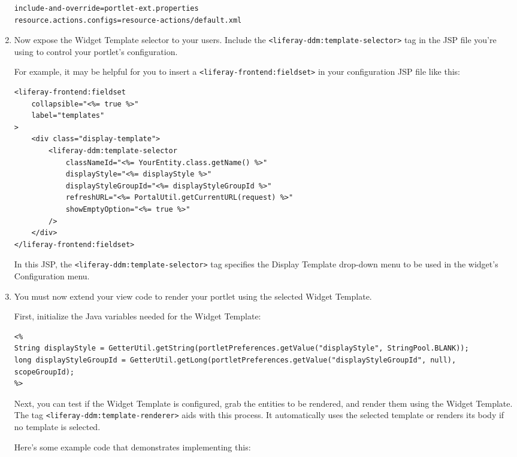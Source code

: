 \begin{enumerate}
\begin{verbatim}
include-and-override=portlet-ext.properties
resource.actions.configs=resource-actions/default.xml
\end{verbatim}
\item
  Now expose the Widget Template selector to your users. Include the
  \texttt{\textless{}liferay-ddm:template-selector\textgreater{}} tag in
  the JSP file you're using to control your portlet's configuration.

  For example, it may be helpful for you to insert a
  \texttt{\textless{}liferay-frontend:fieldset\textgreater{}} in your
  configuration JSP file like this:

\begin{verbatim}
<liferay-frontend:fieldset
    collapsible="<%= true %>"
    label="templates"
>
    <div class="display-template">
        <liferay-ddm:template-selector
            classNameId="<%= YourEntity.class.getName() %>"
            displayStyle="<%= displayStyle %>"
            displayStyleGroupId="<%= displayStyleGroupId %>"
            refreshURL="<%= PortalUtil.getCurrentURL(request) %>"
            showEmptyOption="<%= true %>"
        />
    </div>
</liferay-frontend:fieldset>
\end{verbatim}

  In this JSP, the
  \texttt{\textless{}liferay-ddm:template-selector\textgreater{}} tag
  specifies the Display Template drop-down menu to be used in the
  widget's Configuration menu.
\item
  You must now extend your view code to render your portlet using the
  selected Widget Template.

  First, initialize the Java variables needed for the Widget Template:

\begin{verbatim}
<%
String displayStyle = GetterUtil.getString(portletPreferences.getValue("displayStyle", StringPool.BLANK));
long displayStyleGroupId = GetterUtil.getLong(portletPreferences.getValue("displayStyleGroupId", null), scopeGroupId);
%>
\end{verbatim}

  Next, you can test if the Widget Template is configured, grab the
  entities to be rendered, and render them using the Widget Template.
  The tag
  \texttt{\textless{}liferay-ddm:template-renderer\textgreater{}} aids
  with this process. It automatically uses the selected template or
  renders its body if no template is selected.

  Here's some example code that demonstrates implementing this:


\end{enumerate}
